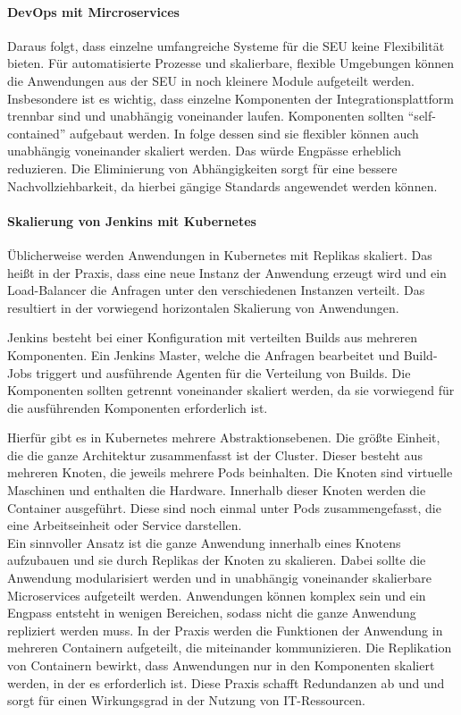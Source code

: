\paragraph{DevOps mit Mircroservices}
Daraus folgt, dass einzelne umfangreiche Systeme für die \ac{SEU} keine Flexibilität bieten. Für automatisierte Prozesse und skalierbare, flexible Umgebungen können die Anwendungen aus der \ac{SEU} in noch kleinere Module aufgeteilt werden. Insbesondere ist es wichtig, dass einzelne Komponenten der Integrationsplattform trennbar sind und unabhängig voneinander laufen. Komponenten sollten \enquote{self-contained} aufgebaut werden. In folge dessen sind sie flexibler können auch unabhängig voneinander skaliert werden. Das würde Engpässe erheblich reduzieren. Die Eliminierung von Abhängigkeiten sorgt für eine bessere Nachvollziehbarkeit, da hierbei gängige Standards angewendet werden können.

\paragraph{Skalierung von Jenkins mit Kubernetes}
\label{jenkins:skalierung}
Üblicherweise werden Anwendungen in Kubernetes mit Replikas skaliert. Das heißt in der Praxis, dass eine neue Instanz der Anwendung erzeugt wird und ein Load-Balancer die Anfragen unter den verschiedenen Instanzen verteilt. Das resultiert in der vorwiegend horizontalen Skalierung von Anwendungen. 

Jenkins besteht bei einer Konfiguration mit verteilten Builds aus mehreren Komponenten. Ein Jenkins Master, welche die Anfragen bearbeitet und Build-Jobs triggert und ausführende Agenten für die Verteilung von Builds. Die Komponenten sollten getrennt voneinander skaliert werden, da sie vorwiegend für die ausführenden Komponenten erforderlich ist. 

Hierfür gibt es in Kubernetes mehrere Abstraktionsebenen. Die größte Einheit, die die ganze Architektur zusammenfasst ist der Cluster. Dieser besteht aus mehreren Knoten, die jeweils mehrere Pods beinhalten. Die Knoten sind virtuelle Maschinen und enthalten die Hardware. Innerhalb dieser Knoten werden die Container ausgeführt. Diese sind noch einmal unter Pods zusammengefasst, die eine Arbeitseinheit oder Service darstellen. 
\medskip
\\
Ein sinnvoller Ansatz ist die ganze Anwendung innerhalb eines Knotens aufzubauen und sie durch Replikas der Knoten zu skalieren. Dabei sollte die Anwendung modularisiert werden und in unabhängig voneinander skalierbare Microservices aufgeteilt werden. Anwendungen können komplex sein und ein Engpass entsteht in wenigen Bereichen, sodass nicht die ganze Anwendung repliziert werden muss. In der Praxis werden die Funktionen der Anwendung in mehreren Containern aufgeteilt, die miteinander kommunizieren. Die Replikation von Containern bewirkt, dass Anwendungen nur in den Komponenten skaliert werden, in der es erforderlich ist. Diese Praxis schafft Redundanzen ab und und sorgt für einen Wirkungsgrad in der Nutzung von IT-Ressourcen.

